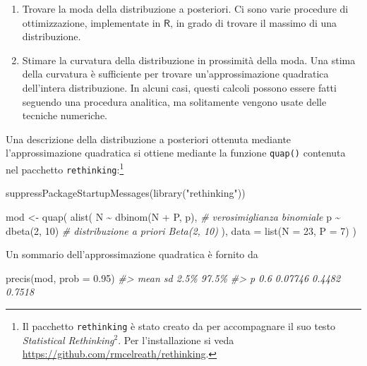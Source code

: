 \documentclass[
  11pt,
]{krantz}
\makeatletter
\newenvironment{Shaded}{\begin{snugshade}}{\end{snugshade}}
\newcommand{\AttributeTok}[1]{\textcolor[rgb]{0.61,0.61,0.61}{#1}}
\newcommand{\CommentTok}[1]{\textcolor[rgb]{0.37,0.37,0.37}{\textit{#1}}}
\newcommand{\DecValTok}[1]{\textcolor[rgb]{0.06,0.06,0.06}{#1}}
\newcommand{\FloatTok}[1]{\textcolor[rgb]{0.06,0.06,0.06}{#1}}
\newcommand{\FunctionTok}[1]{\textcolor[rgb]{0,0,0}{#1}}
\newcommand{\NormalTok}[1]{#1}
\newcommand{\OtherTok}[1]{\textcolor[rgb]{0.37,0.37,0.37}{#1}}
\newcommand{\SpecialCharTok}[1]{\textcolor[rgb]{0,0,0}{#1}}
\newcommand{\StringTok}[1]{\textcolor[rgb]{0.5,0.5,0.5}{#1}}
\providecommand{\tightlist}{%
  \setlength{\itemsep}{0pt}\setlength{\parskip}{0pt}}
\newenvironment{kframe}{%
\medskip{}
\setlength{\fboxsep}{.8em}
 \def\at@end@of@kframe{}%
 \ifinner\ifhmode%
  \def\at@end@of@kframe{\end{minipage}}%
  \begin{minipage}{\columnwidth}%
 \fi\fi%
 \def\FrameCommand##1{\hskip\@totalleftmargin \hskip-\fboxsep
 \colorbox{shadecolor}{##1}\hskip-\fboxsep
     \hskip-\linewidth \hskip-\@totalleftmargin \hskip\columnwidth}%
 \MakeFramed {\advance\hsize-\width
   \@totalleftmargin\z@ \linewidth\hsize
   \@setminipage}}%
 {\par\unskip\endMakeFramed%
 \at@end@of@kframe}
\renewenvironment{Shaded}{\begin{kframe}}{\end{kframe}}
\newcommand{\R}{\textsf{R}} %
\theoremstyle{definition}
\theoremstyle{definition}
\theoremstyle{definition}
\theoremstyle{definition}
\theoremstyle{remark}
\makeatother
\begin{document}
\begin{enumerate}
\def\labelenumi{\arabic{enumi}.}
\tightlist
\item
  Trovare la moda della distribuzione a posteriori. Ci sono varie procedure di ottimizzazione, implementate in \(\R\), in grado di trovare il massimo di una distribuzione.
\item
  Stimare la curvatura della distribuzione in prossimità della moda. Una stima della curvatura è sufficiente per trovare un'approssimazione quadratica dell'intera distribuzione. In alcuni casi, questi calcoli possono essere fatti seguendo una procedura analitica, ma solitamente vengono usate delle tecniche numeriche.
\end{enumerate}

Una descrizione della distribuzione a posteriori ottenuta mediante l'approssimazione quadratica si ottiene mediante la funzione \texttt{quap()} contenuta nel pacchetto \texttt{rethinking}:\footnote{Il pacchetto \texttt{rethinking} è stato creato da \citet{McElreath_rethinking} per accompagnare il suo testo \emph{Statistical Rethinking}\(^2\). Per l'installazione si veda \url{https://github.com/rmcelreath/rethinking}.}

\begin{Shaded}
\begin{Highlighting}[]
\FunctionTok{suppressPackageStartupMessages}\NormalTok{(}\FunctionTok{library}\NormalTok{(}\StringTok{"rethinking"}\NormalTok{))}

\NormalTok{mod }\OtherTok{\textless{}{-}} \FunctionTok{quap}\NormalTok{(}
  \FunctionTok{alist}\NormalTok{(}
\NormalTok{  N }\SpecialCharTok{\textasciitilde{}} \FunctionTok{dbinom}\NormalTok{(N }\SpecialCharTok{+}\NormalTok{ P, p), }\CommentTok{\# verosimiglianza binomiale}
\NormalTok{  p }\SpecialCharTok{\textasciitilde{}} \FunctionTok{dbeta}\NormalTok{(}\DecValTok{2}\NormalTok{, }\DecValTok{10}\NormalTok{) }\CommentTok{\# distribuzione a priori Beta(2, 10)}
\NormalTok{  ),}
  \AttributeTok{data =} \FunctionTok{list}\NormalTok{(}\AttributeTok{N =} \DecValTok{23}\NormalTok{, }\AttributeTok{P =} \DecValTok{7}\NormalTok{)}
\NormalTok{)}
\end{Highlighting}
\end{Shaded}

Un sommario dell'approssimazione quadratica è fornito da

\begin{Shaded}
\begin{Highlighting}[]
\FunctionTok{precis}\NormalTok{(mod, }\AttributeTok{prob =} \FloatTok{0.95}\NormalTok{)}
\CommentTok{\#\textgreater{}   mean      sd   2.5\%  97.5\%}
\CommentTok{\#\textgreater{} p  0.6 0.07746 0.4482 0.7518}
\end{Highlighting}
\end{Shaded}
\end{document}
